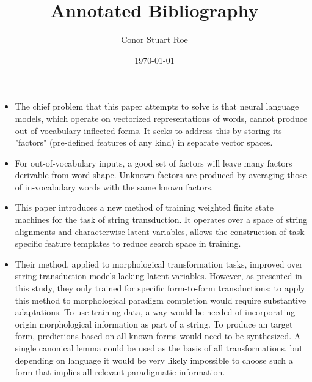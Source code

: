 \documentclass[12pt]{report}
\title{Annotated Bibliography}
\author{Conor Stuart Roe}
\date{\today}
\begin{document}
\maketitle
\thispagestyle{headings}


\begin{itemize}
	
	\item The chief problem that this paper attempts to solve is that neural language models, which operate on vectorized representations of words, cannot produce out-of-vocabulary inflected forms. It seeks to address this by storing its "factors" (pre-defined features of any kind) in separate vector spaces.
	
	\item For out-of-vocabulary inputs, a good set of factors will leave many factors derivable from word shape. Unknown factors are produced by averaging those of in-vocabulary words with the same known factors.
	
\end{itemize}


\begin{itemize}
	
	\item This paper introduces a new method of training weighted finite state machines for the task of string transduction. It operates over a space of string alignments and characterwise latent variables, allows the construction of task-specific feature templates to reduce search space in training. 
	
	\item Their method, applied to morphological transformation tasks, improved over string transduction models lacking latent variables. However, as presented in this study, they only trained for specific form-to-form transductions; to apply this method to morphological paradigm completion would require substantive adaptations. To use training data, a way would be needed of incorporating origin morphological information as part of a string. To produce an target form, predictions based on all known forms would need to be synthesized. A single canonical lemma could be used as the basis of all transformations, but depending on language it would be very likely impossible to choose such a form that implies all relevant paradigmatic information.
	
\end{itemize}
\end{document}
